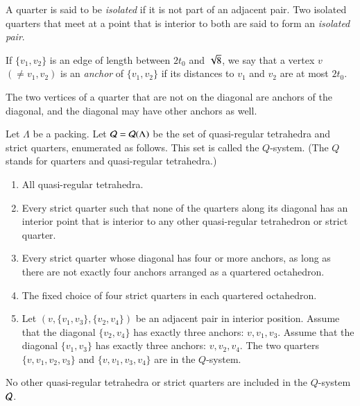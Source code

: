\begin{definition}
A quarter is said to be {\it isolated} if it is
not part of an adjacent pair.  Two isolated quarters that meet at
a point that is interior to both are said to form an {\it isolated
pair}.
%
\end{definition}


\begin{definition} \label{def:anchor}
If $\{v_1,v_2\}$ is an edge of length between $2t_0$ and $\sqrt8$,
we say that a vertex $v$ $(\ne v_1,v_2)$ is an {\it {}
anchor\/} of $\{v_1,v_2\}$ if its distances to $v_1$ and $v_2$ are
at most $2t_0$.
%
\end{definition}

The two vertices of a quarter that are not on the diagonal are
anchors of the diagonal, and the diagonal may have other anchors
as well.

\begin{definition}\label{def:q-system}  Let
$\Lambda$ be a packing. Let ${\mathcal Q}={\mathcal Q}(\Lambda)$ be the set of
quasi-regular tetrahedra and strict quarters, enumerated as
follows. This set is called the $Q$-system.  (The $Q$ stands for
quarters and quasi-regular tetrahedra.)
%


\begin{enumerate}
   \item All quasi-regular tetrahedra.
   \item Every strict quarter such that none of the quarters along
   its diagonal has an interior point that is interior to any other
   quasi-regular tetrahedron or strict quarter.
   \item Every strict quarter whose diagonal has four or more
   anchors, as long as there are not exactly four anchors arranged
   as a quartered
   octahedron.
   \item The fixed choice of four strict quarters in each
   quartered octahedron.
   \item Let $(v,\{v_1,v_3\},\{v_2,v_4\})$ be an adjacent pair in interior
   position.  Assume that the diagonal $\{v_2,v_4\}$ has exactly three anchors:
    $v,v_1,v_3$.  Assume that the diagonal $\{v_1,v_3\}$ has exactly three anchors:
    $v,v_2,v_4$.  The two quarters $\{v,v_1,v_2,v_3\}$ and $\{v,v_1,v_3,v_4\}$ are
    in the $Q$-system.
\end{enumerate}
No other quasi-regular tetrahedra or strict quarters are included
in the $Q$-system ${\mathcal Q}$.
\end{definition}


